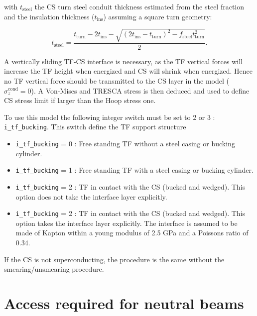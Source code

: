 \documentclass[hidelinks]{article}
\numberwithin{equation}{section}
\begin{document}
    \noindent with $t_\mathrm{steel}$ the CS turn steel conduit thickness 
    estimated from the steel fraction and the insulation thickness ($t_\mathrm{ins}$)
    assuming a square turn geometry:

    \begin{equation}
        t_\mathrm{steel} = \frac{t_\mathrm{turn} - 2t_\mathrm{ins} - 
        \sqrt{(2t_\mathrm{ins} - t_\mathrm{turn})^2 - 
        f_\mathrm{steel}t_\mathrm{turn}^2} }{2}.
    \end{equation}

    \noindent A vertically sliding TF-CS interface is necessary, as the TF 
    vertical forces will increase the TF height when energized and CS will 
    shrink when energized. Hence no TF vertical force should be transmitted
    to the CS layer in the model ($\sigma_z^\mathrm{cond} = 0 $). A Von-Mises
    and TRESCA stress is then deduced and used to define CS stress limit if 
    larger than the Hoop stress one.

    \noindent To use this model the following integer switch must be set to 2 or
    3 : \texttt{i\_tf\_bucking}. This switch define the TF support structure

    \begin{itemize}
        \item \texttt{i\_tf\_bucking} = 0 : Free standing TF without a steel 
            casing or bucking cylinder.
        \item \texttt{i\_tf\_bucking} = 1 : Free standing TF with a steel casing
            or bucking cylinder.
        \item \texttt{i\_tf\_bucking} = 2 : TF in contact with the CS (bucked and
            wedged). This option does not take the interface layer explicitly.
        \item \texttt{i\_tf\_bucking} = 2 : TF in contact with the CS (bucked and
            wedged). This option takes the interface layer explicitly. The 
            interface is assumed to be made of Kapton within a young modulus of 
            2.5 GPa and a Poissons ratio of 0.34.
    \end{itemize}

    \noindent If the CS is not superconducting, the procedure is the same without
    the smearing/unsmearing procedure. 

    \section{Access required for neutral beams}
\end{document}
